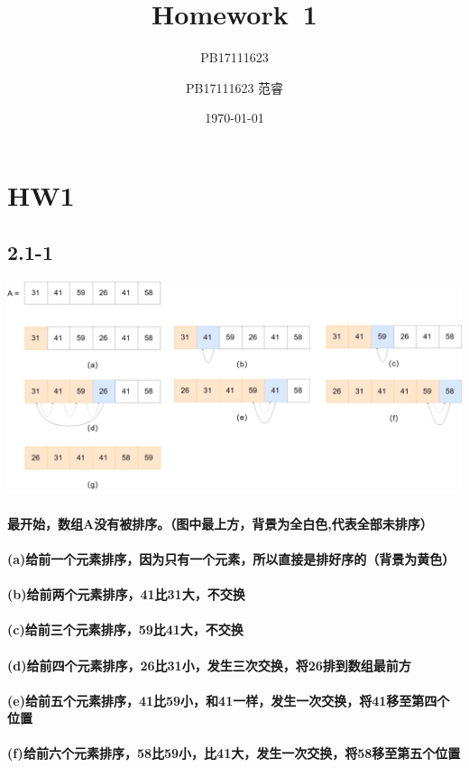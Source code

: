 \documentclass[UTF8]{ctexart}
\title{Homework\ 1}
\author{PB17111623}
\author{PB17111623 范睿}
\date{\today}
\begin{document}
\maketitle
\section{HW1}
\subsection{2.1-1}
\includegraphics[scale=0.1]{21-1.png}
\paragraph{最开始，数组A没有被排序。（图中最上方，背景为全白色,代表全部未排序）}
\paragraph{(a)给前一个元素排序，因为只有一个元素，所以直接是排好序的（背景为黄色）}
\paragraph{(b)给前两个元素排序，41比31大，不交换}
\paragraph{(c)给前三个元素排序，59比41大，不交换}
\paragraph{(d)给前四个元素排序，26比31小，发生三次交换，将26排到数组最前方}
\paragraph{(e)给前五个元素排序，41比59小，和41一样，发生一次交换，将41移至第四个位置}
\paragraph{(f)给前六个元素排序，58比59小，比41大，发生一次交换，将58移至第五个位置}
\end{document}
